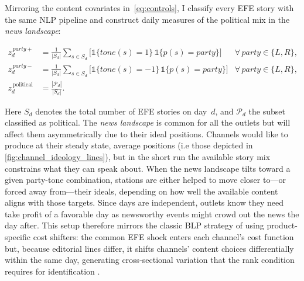 \documentclass[12pt]{article}
\begin{document}
	Mirroring the content covariates in~\eqref{eq:controls}, I classify every EFE story with the same NLP pipeline and construct daily measures of the political mix in the \emph{news landscape}:
	
	\begin{equation}\label{eq:first_stage}
		\begin{aligned}
			z_d^{\,party+} &= \frac{1}{|S_d|}\sum_{s\in S_d}
			\bigl[\mathds{1}\{tone(s)=1\}\,\mathds{1}\{p(s)=\textit{party}\}\bigr]
			&\forall\,\textit{party}\in\{L,R\},\\
			z_d^{\,party-} &= \frac{1}{|S_d|}\sum_{s\in S_d}
			\bigl[\mathds{1}\{tone(s)=-1\}\,\mathds{1}\{p(s)=\textit{party}\}\bigr]
			&\forall\,\textit{party}\in\{L,R\},\\
			z_d^{\,\text{political}} &= \frac{|\mathcal{P}_d|}{|S_d|}.
		\end{aligned}
	\end{equation}
	
	Here $S_d$ denotes the total number of EFE stories on day~$d$, and $\mathcal{P}_d$ the subset classified as political. The \textit{news landscape} is common for all the outlets but will affect them asymmetrically due to their ideal positions. Channels would like to produce at their steady state, average positions (i.e those depicted in \ref{fig:channel_ideology_lines}), but in the short run the available story mix constrains what they can speak about. 
	When the news landscape tilts toward a given party-tone combination, stations are either helped to move closer to—or forced away from—their ideals, depending on how well the available content aligns with those targets. Since days are independent, outlets know they need take profit of a favorable day as newsworthy events might crowd out the news the day after. This setup therefore mirrors the classic BLP strategy of using product-specific cost shifters: the common EFE shock enters each channel’s cost function but, because editorial lines differ, it shifts channels’ content choices differentially within the same day, generating cross-sectional variation that  the  rank condition requires for identification \citep{berry_haile_econometrica}.
	
\end{document}
